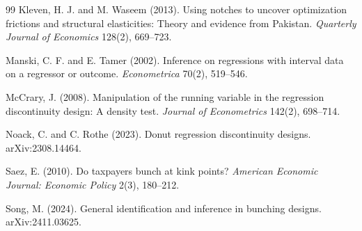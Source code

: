 \documentclass[11pt]{article}
\theoremstyle{definition}
\theoremstyle{plain}
\theoremstyle{remark}
\begin{document}
\begin{thebibliography}{99}
Kleven, H. J. and M. Waseem (2013).
Using notches to uncover optimization frictions and structural elasticities: Theory and evidence from Pakistan.
\emph{Quarterly Journal of Economics} 128(2), 669--723.

Manski, C. F. and E. Tamer (2002).
Inference on regressions with interval data on a regressor or outcome.
\emph{Econometrica} 70(2), 519--546.

McCrary, J. (2008).
Manipulation of the running variable in the regression discontinuity design: A density test.
\emph{Journal of Econometrics} 142(2), 698--714.

Noack, C. and C. Rothe (2023).
Donut regression discontinuity designs.
arXiv:2308.14464.

Saez, E. (2010).
Do taxpayers bunch at kink points?
\emph{American Economic Journal: Economic Policy} 2(3), 180--212.

Song, M. (2024).
General identification and inference in bunching designs.
arXiv:2411.03625.
\end{thebibliography}
\end{document}
